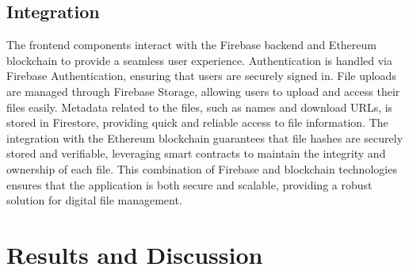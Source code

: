 \documentclass[12pt,a4paper]{report}
\begin{document}
\section{Integration}
\par The frontend components interact with the Firebase 
backend and Ethereum blockchain to provide a seamless user 
experience. Authentication is handled via Firebase 
Authentication, ensuring that users are securely signed in. 
File uploads are managed through Firebase Storage, allowing 
users to upload and access their files easily. Metadata related 
to the files, such as names and download URLs, is stored in 
Firestore, providing quick and reliable access to file 
information. The integration with the Ethereum blockchain 
guarantees that file hashes are securely stored and verifiable, 
leveraging smart contracts to maintain the integrity and 
ownership of each file. This combination of Firebase and 
blockchain technologies ensures that the application is both 
secure and scalable, providing a robust solution for digital
 file management.




\chapter{Results and Discussion}
\end{document}

